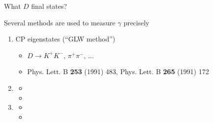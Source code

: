 \documentclass[dvipsnames]{beamer}
\begin{document}
\begin{frame}{What $D$ final states?}
  \begin{center}
    \Large Several methods are used to measure $\gamma$ precisely
  \end{center}
  \vspace{0.2cm}
  \begin{enumerate}
    \setlength\itemsep{1.0em}
    \item{CP eigenstates (``GLW method'')}
    \begin{itemize}
      \item{$D\to K^+K^-$, $\pi^+\pi^-$, ...}
      \item{Phys. Lett. B \textbf{253} (1991) 483, Phys. Lett. B \textbf{265} (1991) 172}
    \end{itemize}
    \item[]{\phantom{Doubly-Cabibbo Suppressed decays (``ADS method'')}}
    \begin{itemize}
      \item[]{\phantom{$D\to K^-\pi^+$, $K^-\pi^+\pi^-\pi^+$, ...}}
      \item[]{}
    \end{itemize}
    \item[]{\phantom{Self-conjugate multi-body final states (``BPGGSZ method'')}}
    \begin{itemize}
      \item[]{\phantom{$D\to K_S^0\pi^+\pi^-$, $K_S^0K^+K^-$, ...}}
      \item[]{}
    \end{itemize}
  \end{enumerate}
\end{frame}
\end{document}
